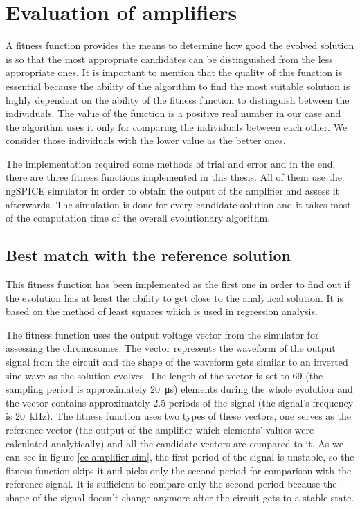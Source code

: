 \chapter{Evaluation of amplifiers} \label{chromosomes-evaluation}
A fitness function provides the means to determine how good the evolved solution is so that the most appropriate candidates can be distinguished from the less appropriate ones. It is important to mention that the quality of this function is essential because the ability of the algorithm to find the most suitable solution is highly dependent on the ability of the fitness function to distinguish between the individuals. The value of the function is a positive real number in our case and the algorithm uses it only for comparing the individuals between each other. We consider those individuals with the lower value as the better ones.

The implementation required some methods of trial and error and in the end, there are three fitness functions implemented in this thesis. All of them use the ngSPICE simulator in order to obtain the output of the amplifier and assess it afterwards. The simulation is done for every candidate solution and it takes most of the computation time of the overall evolutionary algorithm.

\section{Best match with the reference solution}
This fitness function has been implemented as the first one in order to find out if the evolution has at least the ability to get close to the analytical solution. It is based on the method of least squares which is used in regression analysis.

The fitness function uses the output voltage vector from the simulator for assessing the chromosomes. The vector represents the waveform of the output signal from the circuit and the shape of the waveform gets similar to an inverted sine wave as the solution evolves. The length of the vector is set to 69 (the sampling period is approximately \SI{20}{\micro\second}) elements during the whole evolution and the vector contains approximately 2.5 periods of the signal (the signal's frequency is \SI{20}{\kilo\hertz}). The fitness function uses two types of these vectors, one serves as the reference vector (the output of the amplifier which elements' values were calculated analytically) and all the candidate vectors are compared to it. As we can see in figure \ref{ce-amplifier-sim}, the first period of the signal is unstable, so the fitness function skips it and picks only the second period for comparison with the reference signal. It is sufficient to compare only the second period because the shape of the signal doesn't change anymore after the circuit gets to a stable state.

